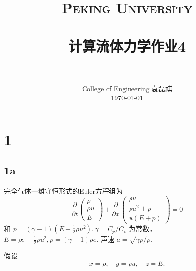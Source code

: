 \documentclass[12pt]{article}
\title{
		\vspace{-1in} 	
		\usefont{OT1}{bch}{b}{n}
		\normalfont \normalsize \textsc{\LARGE Peking University}\\[0.2cm] %
		\horrule{0.5pt} \\[0.2cm]
		\huge \bfseries{计算流体力学作业4} \\[-0.2cm]
		\horrule{2pt} \\[0.2cm]
}
\author{
		\normalfont 								\normalsize
		College of Engineering \quad 2001111690  \quad 袁磊祺\\	\normalsize
        \today
}
\date{}
\begin{document}


\maketitle

\section{1}

\subsection{1a}



完全气体一维守恒形式的Euler方程组为
\begin{equation}
	\frac{\partial}{\partial t}\left(\begin{array}{c}
	\rho \\
	\rho u \\
	E
	\end{array}\right)+\frac{\partial}{\partial x}\left(\begin{array}{c}
	\rho u \\
	\rho u^{2}+p \\
	u(E+p)
	\end{array}\right)=0
	\label{eq:11}
\end{equation}
和 $p=(\gamma-1)\left(E-\frac{1}{2} \rho u^{2}\right), \gamma=C_{p} / C_{v}$ 为常数， $E=\rho e+\frac{1}{2} \rho u^{2}, p=(\gamma-1) \rho e . $ 声速 $a=\sqrt{\gamma p / \rho} .$

假设
\begin{equation}
	x=\rho,\quad y=\rho u, \quad z=E.
	\label{eq:10}
\end{equation}
\end{document}
